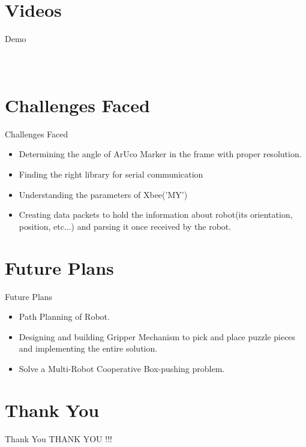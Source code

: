 \documentclass[10pt,a4paper]{beamer}
\begin{document}
\section{Videos}
\begin{frame}{Demo}
\begin{columns}
\begin{figure}

\end{figure}
\begin{figure}

\end{figure}

\end{columns}

\end{frame}

\section{Challenges Faced}
\begin{frame}{Challenges Faced}
	\begin{itemize}
		\item Determining the angle of ArUco Marker in the frame with proper resolution.\pause
		\item Finding the right library for serial communication\pause
		\item Understanding the parameters of Xbee('MY')\pause
		\item Creating data packets to hold the information about robot(its orientation, position, etc...) and parsing it once received by the robot.
	\end{itemize}
\end{frame}

\section{Future Plans}
\begin{frame}{Future Plans}
	\begin{itemize}
		\item Path Planning of Robot.\pause
		\item Designing and building Gripper Mechanism to pick and place puzzle pieces and implementing the entire solution.\pause
		\item Solve a Multi-Robot Cooperative Box-pushing problem.
	\end{itemize}
\end{frame}


\section{Thank You}
\begin{frame}{Thank You}
	\centering THANK YOU !!!
\end{frame}
\end{document}
